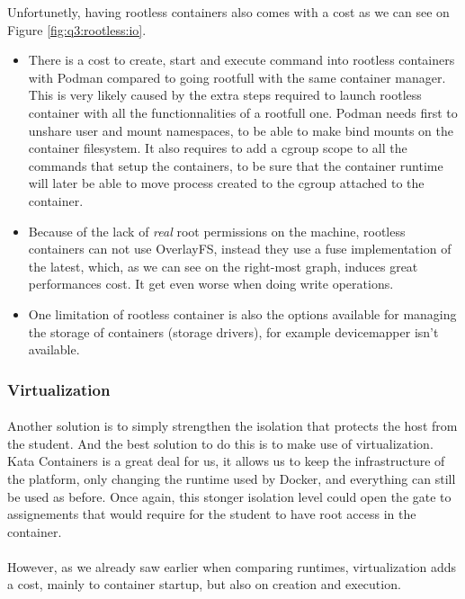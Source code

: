 Unfortunetly, having rootless containers also comes with a cost as we can see on Figure \ref{fig:q3:rootless:io}.
\begin{itemize}
  \item There is a cost to create, start and execute command into rootless containers with Podman compared to going rootfull with the same container manager.  This is very likely caused by the extra steps required to launch rootless container with all the functionnalities of a rootfull one.  Podman needs first to unshare user and mount namespaces, to be able to make bind mounts on the container filesystem.  It also requires to add a cgroup scope to all the commands that setup the containers, to be sure that the container runtime will later be able to move process created to the cgroup attached to the container.
  \item Because of the lack of \textit{real} root permissions on the machine, rootless containers can not use OverlayFS, instead they use a fuse implementation of the latest, which, as we can see on the right-most graph, induces great performances cost.  It get even worse when doing write operations.
  \item One limitation of rootless container is also the options available for managing the storage of containers (storage drivers), for example devicemapper isn't available.
\end{itemize}

\subsubsection{Virtualization}
\paragraph{}Another solution is to simply strengthen the isolation that protects the host from the student.  And the best solution to do this is to make use of virtualization.  Kata Containers is a great deal for us, it allows us to keep the infrastructure of the platform, only changing the runtime used by Docker, and everything can still be used as before.  Once again, this stonger isolation level could open the gate to assignements that would require for the student to have root access in the container.

\paragraph{}However, as we already saw earlier when comparing runtimes, virtualization adds a cost, mainly to container startup, but also on creation and execution.

